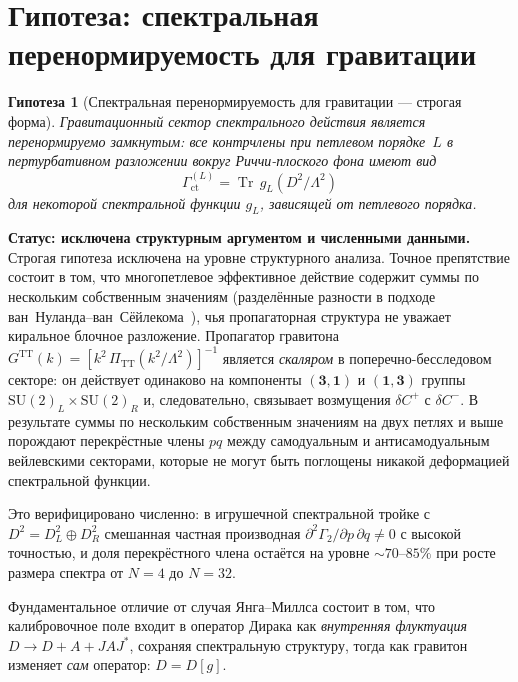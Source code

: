 \documentclass[12pt,a4paper]{article}
\newtheorem{conjecture}[theorem]{Гипотеза}
\theoremstyle{definition}
\theoremstyle{remark}
\newcommand{\Tr}{\operatorname{Tr}}
\newcommand{\Lam}{\Lambda}
\begin{document}
\section{Гипотеза: спектральная перенормируемость для гравитации}
\label{sec:conjecture}

\begin{conjecture}[Спектральная перенормируемость для гравитации --- строгая форма]
\label{conj:spectral}
Гравитационный сектор спектрального действия является
\emph{перенормируемо замкнутым}: все контрчлены при петлевом порядке~$L$ в
пертурбативном разложении вокруг Риччи-плоского фона имеют вид
\begin{equation}\label{eq:conj}
  \Gamma_{\mathrm{ct}}^{(L)} = \Tr\,g_L(D^2/\Lam^2)
\end{equation}
для некоторой спектральной функции $g_L$, зависящей от петлевого порядка.
\end{conjecture}

\noindent\textbf{Статус: исключена структурным аргументом и численными данными.}
Строгая гипотеза исключена на уровне структурного анализа.  Точное препятствие
состоит в том, что многопетлевое эффективное действие содержит
суммы по нескольким собственным значениям (разделённые разности в подходе
ван~Нуланда--ван~Сёйлекома~\cite{vanNuland:2021}), чья пропагаторная
структура не уважает киральное блочное разложение.  Пропагатор гравитона
$G^{\mathrm{TT}}(k) = [k^2\,\Pi_{\mathrm{TT}}(k^2/\Lam^2)]^{-1}$
является \emph{скаляром} в поперечно-бесследовом секторе: он действует
одинаково на компоненты $(\mathbf{3}, \mathbf{1})$ и
$(\mathbf{1}, \mathbf{3})$ группы
$\mathrm{SU}(2)_L \times \mathrm{SU}(2)_R$ и, следовательно, связывает
возмущения $\delta C^+$ с $\delta C^-$.  В результате суммы по нескольким собственным значениям на двух петлях и выше порождают перекрёстные члены $pq$ между
самодуальным и антисамодуальным вейлевскими секторами, которые не могут быть
поглощены никакой деформацией спектральной функции.

Это верифицировано численно: в игрушечной спектральной тройке с
$D^2 = D^2_L \oplus D^2_R$ смешанная частная производная
$\partial^2\Gamma_2/\partial p\,\partial q \neq 0$ с высокой точностью, и
доля перекрёстного члена остаётся на уровне $\sim 70$--$85\%$ при росте
размера спектра от $N = 4$ до $N = 32$.

Фундаментальное отличие от случая Янга--Миллса состоит в том, что
калибровочное поле входит в оператор Дирака как \emph{внутренняя
флуктуация} $D \to D + A + JAJ^*$, сохраняя спектральную структуру, тогда
как гравитон изменяет \emph{сам} оператор: $D = D[g]$.
\end{document}
